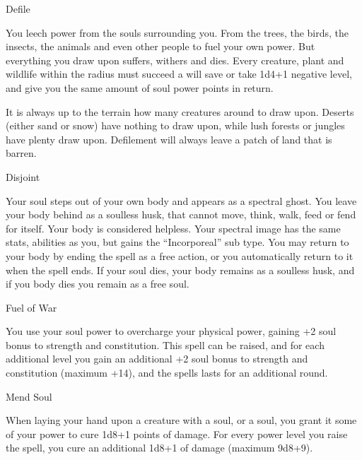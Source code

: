 \begin{soulpower}{Defile}
  \rangeclose

  You leech power from the souls surrounding you. From the trees, the birds,
  the insects, the animals and even other people to fuel your own power. But
  everything you draw upon suffers, withers and dies. Every creature, plant
  and wildlife within the radius must succeed a will save or take 1d4+1 negative
  level, and give you the same amount of soul power points in return.

  It is always up to the terrain how many creatures around to draw upon.
  Deserts (either sand or snow) have nothing to draw upon, while lush forests
  or jungles have plenty draw upon. Defilement will always leave a patch of
  land that is barren.
\end{soulpower}

\begin{soulpower}{Disjoint}
  \components{-}
  \rangepersonal

  Your soul steps out of your own body and appears as a spectral ghost. You
  leave your body behind as a soulless husk, that cannot move, think, walk,
  feed or fend for itself. Your body is considered helpless.
  Your spectral image has the same stats, abilities as you, but gains the
  ``Incorporeal'' sub type. You may return to your body by ending the spell
  as a free action, or you automatically return to it when the spell ends.
  If your soul dies, your body remains as a soulless husk, and if you body
  dies you remain as a free soul.
\end{soulpower}

\begin{soulpower}{Fuel of War}
  \rangepersonal

  You use your soul power to overcharge your physical power, gaining +2 soul
  bonus to strength and constitution. This spell can be raised, and for each
  additional level you gain an additional +2 soul bonus to strength and
  constitution (maximum +14), and the spells lasts for an additional round.
\end{soulpower}

\begin{soulpower}{Mend Soul}
  \rangetouch
  \instantaneous

  When laying your hand upon a creature with a soul, or a soul, you grant it
  some of your power to cure 1d8+1 points of damage. For every power level you
  raise the spell, you cure an additional 1d8+1 of damage (maximum 9d8+9).
\end{soulpower}

